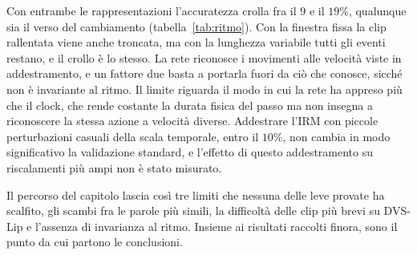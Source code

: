 Con entrambe le rappresentazioni l'accuratezza crolla fra il $9$ e il $19\%$, qualunque sia il verso del cambiamento (tabella~\ref{tab:ritmo}). Con la finestra fissa la clip rallentata viene anche troncata, ma con la lunghezza variabile tutti gli eventi restano, e il crollo è lo stesso. La rete riconosce i movimenti alle velocità viste in addestramento, e un fattore due basta a portarla fuori da ciò che conosce, sicché non è invariante al ritmo. Il limite riguarda il modo in cui la rete ha appreso più che il clock, che rende costante la durata fisica del passo ma non insegna a riconoscere la stessa azione a velocità diverse. Addestrare l'IRM con piccole perturbazioni casuali della scala temporale, entro il $10\%$, non cambia in modo significativo la validazione standard, e l'effetto di questo addestramento su riscalamenti più ampi non è stato misurato.

Il percorso del capitolo lascia così tre limiti che nessuna delle leve provate ha scalfito, gli scambi fra le parole più simili, la difficoltà delle clip più brevi su DVS-Lip e l'assenza di invarianza al ritmo. Insieme ai risultati raccolti finora, sono il punto da cui partono le conclusioni.
